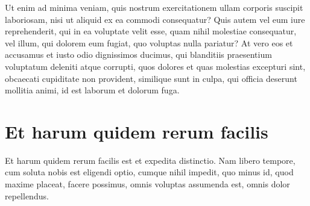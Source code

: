 Ut enim ad minima veniam, quis nostrum exercitationem ullam corporis suscipit laboriosam, nisi ut aliquid ex ea commodi consequatur? Quis autem vel eum iure reprehenderit, qui in ea voluptate velit esse, quam nihil molestiae consequatur, vel illum, qui dolorem eum fugiat, quo voluptas nulla pariatur? At vero eos et accusamus et iusto odio dignissimos ducimus, qui blanditiis praesentium voluptatum deleniti atque corrupti, quos dolores et quas molestias excepturi sint, obcaecati cupiditate non provident, similique sunt in culpa, qui officia deserunt mollitia animi, id est laborum et dolorum fuga.


\section{Et harum quidem rerum facilis}

Et harum quidem rerum facilis est et expedita distinctio. Nam libero tempore, cum soluta nobis est eligendi optio, cumque nihil impedit, quo minus id, quod maxime placeat, facere possimus, omnis voluptas assumenda est, omnis dolor repellendus.


